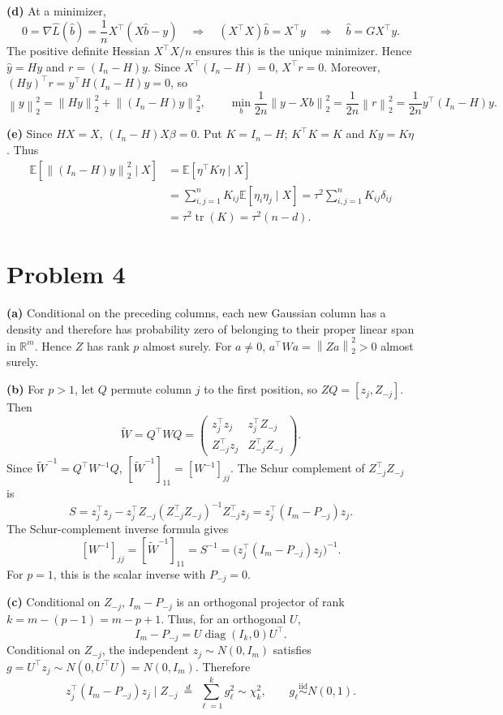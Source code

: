 \documentclass[11pt]{article}
\newcommand{\E}{\mathbb E}
\newcommand{\R}{\mathbb R}
\newcommand{\norm}[1]{\left\lVert#1\right\rVert}
\begin{document}
\textbf{(d)} At a minimizer,
\[
 0=\nabla\widehat L(\widehat b)
 =\frac1n X^\top(X\widehat b-y)
 \quad\Longrightarrow\quad
 (X^\top X)\widehat b=X^\top y
 \quad\Longrightarrow\quad\widehat b=GX^\top y.
\]
The positive definite Hessian $X^\top X/n$ ensures this is the unique
minimizer. Hence
$\widehat y=Hy$ and $r=(I_n-H)y$.
Since $X^\top(I_n-H)=0$, $X^\top r=0$. Moreover,
$(Hy)^\top r=y^\top H(I_n-H)y=0$, so
\[
 \norm y_2^2=\norm{Hy}_2^2+\norm{(I_n-H)y}_2^2,\qquad
 \min_b\frac1{2n}\norm{y-Xb}_2^2
 =\frac1{2n}\norm r_2^2=\frac1{2n}y^\top(I_n-H)y.
\]

\textbf{(e)} Since $HX=X$, $(I_n-H)X\beta=0$. Put $K=I_n-H$;
$K^\top K=K$ and $Ky=K\eta$. Thus
\begin{align*}
 \E[\norm{(I_n-H)y}_2^2\mid X]
 &=\E[\eta^\top K\eta\mid X]\\
 &=\sum_{i,j=1}^n K_{ij}\E[\eta_i\eta_j\mid X]
 =\tau^2\sum_{i,j=1}^n K_{ij}\delta_{ij}\\
 &=\tau^2\operatorname{tr}(K)=\tau^2(n-d).
\end{align*}

\section*{Problem 4}
\textbf{(a)} Conditional on the preceding columns, each new Gaussian
column has a density and therefore has probability zero of belonging
to their proper linear span in $\R^m$. Hence $Z$ has rank $p$ almost
surely. For $a\ne0$, $a^\top Wa=\norm{Za}_2^2>0$ almost surely.

\textbf{(b)} For $p>1$, let $Q$ permute column $j$ to the first position,
so $ZQ=[z_j,Z_{-j}]$. Then
\[
 \widetilde W=Q^\top WQ=\begin{pmatrix}
 z_j^\top z_j&z_j^\top Z_{-j}\\
 Z_{-j}^\top z_j&Z_{-j}^\top Z_{-j}
 \end{pmatrix}.
\]
Since $\widetilde W^{-1}=Q^\top W^{-1}Q$,
$[\widetilde W^{-1}]_{11}=[W^{-1}]_{jj}$.
The Schur complement of $Z_{-j}^\top Z_{-j}$ is
\[
 S=z_j^\top z_j-z_j^\top Z_{-j}(Z_{-j}^\top Z_{-j})^{-1}Z_{-j}^\top z_j
 =z_j^\top(I_m-P_{-j})z_j.
\]
The Schur-complement inverse formula gives
\[
 [W^{-1}]_{jj}
 =[\widetilde W^{-1}]_{11}=S^{-1}
 =\big(z_j^\top(I_m-P_{-j})z_j\big)^{-1}.
\]
For $p=1$, this is the scalar inverse with $P_{-j}=0$.

\textbf{(c)} Conditional on $Z_{-j}$, $I_m-P_{-j}$ is an orthogonal
projector of rank $k=m-(p-1)=m-p+1$. Thus, for an orthogonal $U$,
\[
 I_m-P_{-j}=U\operatorname{diag}(I_k,0)U^\top.
\]
Conditional on $Z_{-j}$, the independent $z_j\sim N(0,I_m)$ satisfies
$g=U^\top z_j\sim N(0,U^\top U)=N(0,I_m)$. Therefore
\[
 z_j^\top(I_m-P_{-j})z_j\mid Z_{-j}
 \ \overset{d}=\ \sum_{\ell=1}^{k}g_\ell^2\sim\chi_k^2,
 \qquad g_\ell\overset{\mathrm{iid}}\sim N(0,1).
\]
\end{document}
